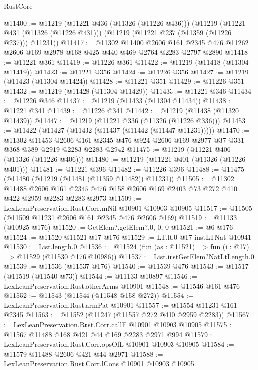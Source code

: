 \begin{lexlean}{RustCore}
\begin{coremodule}
@11400 := @11219
    (@11221 @436 (@11326 (@11226 @436)))
    (@11219
      (@11221 @431 (@11326 (@11226 @431)))
      (@11219 (@11221 @237 (@11359 (@11226 @237))) @11231))
@11417 := @11302
    @11400
    @2606
    @161
    @2345
    @476
    @11262
    @2606
    @169
    @2978
    @168
    @425
    @440
    @469
    @2764
    @2283
    @2797
    @2890
@11418 := @11221 @361
@11419 := @11226 @361
@11422 := @11219 (@11418 (@11304 @11419))
@11423 := @11221 @356
@11424 := @11226 @356
@11427 := @11219 (@11423 (@11304 @11424))
@11428 := @11221 @351
@11429 := @11226 @351
@11432 := @11219 (@11428 (@11304 @11429))
@11433 := @11221 @346
@11434 := @11226 @346
@11437 := @11219 (@11433 (@11304 @11434))
@11438 := @11221 @341
@11439 := @11226 @341
@11442 := @11219 (@11438 (@11320 @11439))
@11447 := @11219 (@11221 @336 (@11326 (@11226 @336)))
@11453 := @11422 (@11427 (@11432 (@11437 (@11442 (@11447 @11231)))))
@11470 := @11302
    @11453
    @2606
    @161
    @2345
    @476
    @924
    @2606
    @169
    @2977
    @37
    @331
    @368
    @389
    @2919
    @2283
    @2283
    @2942
@11475 := @11219 (@11221 @406 (@11326 (@11226 @406)))
@11480 := @11219 (@11221 @401 (@11326 (@11226 @401)))
@11481 := @11221 @396
@11482 := @11226 @396
@11488 := @11475 (@11480 (@11219 (@11481 (@11359 @11482)) @11231))
@11505 := @11302
    @11488
    @2606
    @161
    @2345
    @476
    @158
    @2606
    @169
    @2403
    @73
    @272
    @410
    @422
    @2959
    @2283
    @2283
    @2973
@11509 := LexLeanPreservation.Rust.Corr.mNil @10901 @10903 @10905
@11517 := @11505 (@11509 @11231 @2606 @161 @2345 @476 @2606 @169)
@11519 := @11133 (@10925 @176)
@11520 := GetElem?.getElem?.{0, 0, 0}
@11521 := @6 @176
@11524 := @11520 @11521 @17 @176
@11529 := LT.lt.{0} @17 instLTNat @10941
@11530 := List.length.{0}
@11536 := @11524 (fun (as : @11521) => fun (i : @17) => @11529 (@11530 @176 @10986))
@11537 := List.instGetElem?NatLtLength.{0}
@11539 := @11536 (@11537 @176)
@11540 := @11539 @476
@11543 := @11517 (@11519 (@11540 @73))
@11544 := @11133 @10897
@11546 := LexLeanPreservation.Rust.otherArms @10901
@11548 := @11546 @161 @476
@11552 := @11543 (@11544 (@11548 @158 @272))
@11554 := LexLeanPreservation.Rust.armPat @10901
@11557 := @11554 @11231 @161 @2345
@11563 := @11552 (@11247 (@11557 @272 @410 @2959 @2283))
@11567 := LexLeanPreservation.Rust.Corr.callF @10901 @10903 @10905
@11575 := @11567 @11488 @168 @421 @44 @169 @2283 @2971 @994
@11579 := LexLeanPreservation.Rust.Corr.opsOfL @10901 @10903 @10905
@11584 := @11579 @11488 @2606 @421 @44 @2971
@11588 := LexLeanPreservation.Rust.Corr.lCons @10901 @10903 @10905

\end{coremodule}
\end{lexlean}
